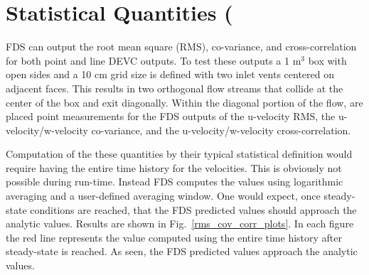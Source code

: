 \documentclass[11pt]{book}
\begin{document}
\section{Statistical Quantities (\texorpdfstring{})}

FDS can output the root mean square (RMS), co-variance, and cross-correlation for both point and line {\ct DEVC} outputs.  To test these outputs a 1 m$^3$ box with open sides and a 10 cm grid size is defined with two inlet vents centered on adjacent faces.  This results in two orthogonal flow streams that collide at the center of the box and exit diagonally.  Within the diagonal portion of the flow, are placed point measurements for the FDS outputs of the u-velocity RMS, the u-velocity/w-velocity co-variance, and the u-velocity/w-velocity cross-correlation.   

Computation of the these quantities by their typical statistical definition would require having the entire time history for the velocities.  This is obviously not possible during run-time.  Instead FDS computes the values using logarithmic averaging and a user-defined averaging window.  One would expect, once steady-state conditions are reached, that the FDS predicted values should approach the analytic values.  Results are shown in Fig.~\ref{rms_cov_corr_plots}.  In each figure the red line represents the value computed using the entire time history after steady-state is reached.  As seen, the FDS predicted values approach the analytic values.
\end{document}
